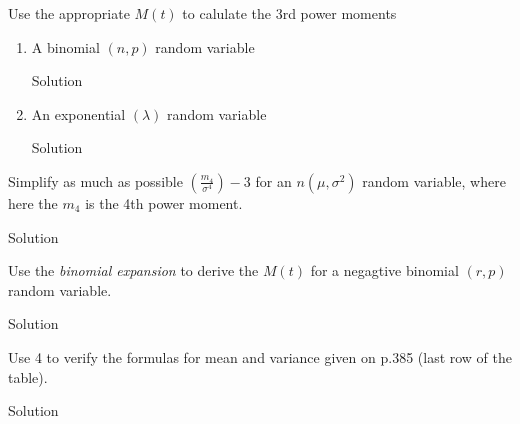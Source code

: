 \documentclass{article}
\begin{document}
\begin{spacing}{1.1}
\newpage
\begin{homeworkProblem}
  Use the appropriate $M( t)$ to calulate the 3rd power moments

  \begin{enumerate}[(1)]
    \item A binomial $(n, p)$ random variable
      \begin{homeworkSection}{Solution}
        
      \end{homeworkSection}
    \item An exponential $(\lambda)$ random variable
      \begin{homeworkSection}{Solution}
        
      \end{homeworkSection}
  \end{enumerate}
\end{homeworkProblem}

\newpage
\begin{homeworkProblem}
  Simplify as much as possible $\left(\frac{ m_4}{ \sigma^4}\right) - 3$ 
  for an $n(\mu, \sigma^2)$ random variable, where here the $m_4$ is the
  4th power moment.
  \begin{homeworkSection}{Solution}
    
  \end{homeworkSection}
\end{homeworkProblem}

\newpage
\begin{homeworkProblem}
  Use the \emph{binomial expansion} to derive the $M(t)$ for a negagtive
  binomial $(r, p)$ random variable.
  \begin{homeworkSection}{Solution}
    
  \end{homeworkSection}
\end{homeworkProblem}
\newpage
\begin{homeworkProblem}
  Use 4 to verify the formulas for mean and variance given on p.385 
  (last row of the table).
  \begin{homeworkSection}{Solution}
    
  \end{homeworkSection}
\end{homeworkProblem}
  
\end{spacing}
\end{document}
